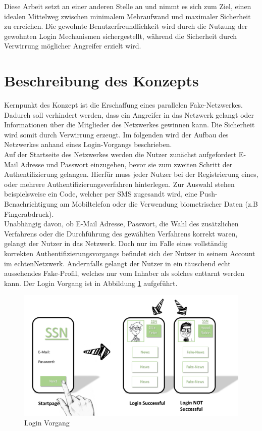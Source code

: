 \documentclass{sigchi}
\begin{document}
Diese Arbeit setzt an einer anderen Stelle an und nimmt es sich zum Ziel, einen idealen Mittelweg zwischen minimalem Mehraufwand und maximaler Sicherheit zu erreichen. Die gewohnte Benutzerfreundlichkeit wird durch die Nutzung der gewohnten Login Mechanismen sichergestellt, während die Sicherheit durch Verwirrung möglicher Angreifer erzielt wird. 

\section{Beschreibung des Konzepts}
\label{Konzept}
Kernpunkt des Konzept ist die Erschaffung eines parallelen Fake-Netzwerkes. Dadurch soll verhindert werden, dass ein Angreifer in das Netzwerk gelangt oder Informationen über die Mitglieder des Netzwerkes gewinnen kann. Die Sicherheit wird somit durch Verwirrung erzeugt. Im folgenden wird der Aufbau des Netzwerkes anhand eines Login-Vorgangs beschrieben. \\
Auf der Startseite des Netzwerkes werden die Nutzer zunächst aufgefordert E-Mail Adresse und Passwort einzugeben, bevor sie zum zweiten Schritt der Authentifizierung gelangen. Hierfür muss jeder Nutzer bei der Registrierung eines, oder mehrere Authentifizierungsverfahren hinterlegen. Zur Auswahl stehen beispielsweise ein Code, welcher per SMS zugesandt wird, eine Push-Benachrichtigung am Mobiltelefon oder die Verwendung biometrischer Daten (z.B Fingerabdruck).\\
Unabhängig davon, ob E-Mail Adresse, Passwort, die Wahl des zusätzlichen Verfahrens oder die Durchführung des gewählten Verfahrens korrekt waren, gelangt der Nutzer in das Netzwerk. Doch nur im Falle eines vollständig korrekten Authentifizierungsvorgangs befindet sich der Nutzer in seinem Account im \glqq echten\grqq Netzwerk. Andernfalls gelangt der Nutzer in ein täuschend echt aussehendes Fake-Profil, welches nur vom Inhaber als solches enttarnt werden kann. Der Login Vorgang ist in Abbildung \ref{fig:Login} aufgeführt. 
\begin{figure}[htbp]
\centering
	\includegraphics[width=0.8\columnwidth]{figures/Loginvorgang.png}
	\caption{Login Vorgang}
	\label{fig:Login}
\end{figure}
\end{document}

